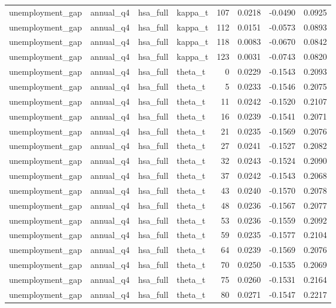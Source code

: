 \begin{tabular}{llllrrrr}
unemployment\_gap & annual\_q4 & hsa\_full & kappa\_t & 107 & 0.0218 & -0.0490 & 0.0925 \\
unemployment\_gap & annual\_q4 & hsa\_full & kappa\_t & 112 & 0.0151 & -0.0573 & 0.0893 \\
unemployment\_gap & annual\_q4 & hsa\_full & kappa\_t & 118 & 0.0083 & -0.0670 & 0.0842 \\
unemployment\_gap & annual\_q4 & hsa\_full & kappa\_t & 123 & 0.0031 & -0.0743 & 0.0820 \\
unemployment\_gap & annual\_q4 & hsa\_full & theta\_t & 0 & 0.0229 & -0.1543 & 0.2093 \\
unemployment\_gap & annual\_q4 & hsa\_full & theta\_t & 5 & 0.0233 & -0.1546 & 0.2075 \\
unemployment\_gap & annual\_q4 & hsa\_full & theta\_t & 11 & 0.0242 & -0.1520 & 0.2107 \\
unemployment\_gap & annual\_q4 & hsa\_full & theta\_t & 16 & 0.0239 & -0.1541 & 0.2071 \\
unemployment\_gap & annual\_q4 & hsa\_full & theta\_t & 21 & 0.0235 & -0.1569 & 0.2076 \\
unemployment\_gap & annual\_q4 & hsa\_full & theta\_t & 27 & 0.0241 & -0.1527 & 0.2082 \\
unemployment\_gap & annual\_q4 & hsa\_full & theta\_t & 32 & 0.0243 & -0.1524 & 0.2090 \\
unemployment\_gap & annual\_q4 & hsa\_full & theta\_t & 37 & 0.0242 & -0.1543 & 0.2068 \\
unemployment\_gap & annual\_q4 & hsa\_full & theta\_t & 43 & 0.0240 & -0.1570 & 0.2078 \\
unemployment\_gap & annual\_q4 & hsa\_full & theta\_t & 48 & 0.0236 & -0.1567 & 0.2077 \\
unemployment\_gap & annual\_q4 & hsa\_full & theta\_t & 53 & 0.0236 & -0.1559 & 0.2092 \\
unemployment\_gap & annual\_q4 & hsa\_full & theta\_t & 59 & 0.0235 & -0.1577 & 0.2104 \\
unemployment\_gap & annual\_q4 & hsa\_full & theta\_t & 64 & 0.0239 & -0.1569 & 0.2076 \\
unemployment\_gap & annual\_q4 & hsa\_full & theta\_t & 70 & 0.0250 & -0.1535 & 0.2069 \\
unemployment\_gap & annual\_q4 & hsa\_full & theta\_t & 75 & 0.0260 & -0.1531 & 0.2164 \\
unemployment\_gap & annual\_q4 & hsa\_full & theta\_t & 80 & 0.0271 & -0.1547 & 0.2217 \\

\end{tabular}
